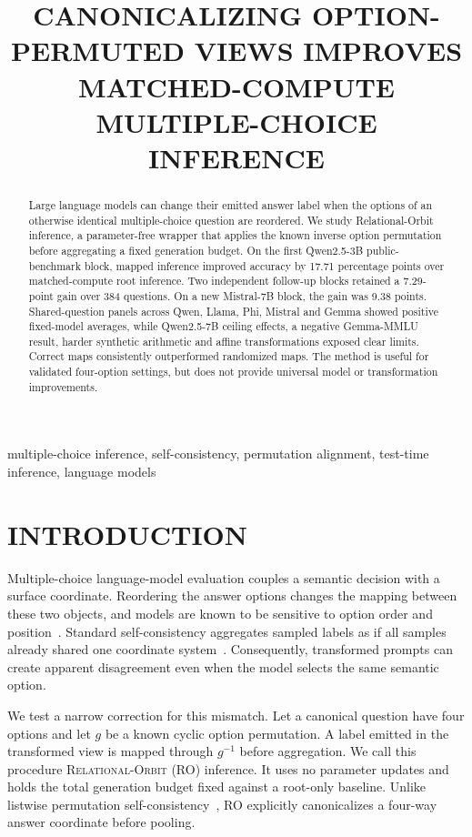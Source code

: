 \documentclass{article}
\title{CANONICALIZING OPTION-PERMUTED VIEWS IMPROVES MATCHED-COMPUTE MULTIPLE-CHOICE INFERENCE}
\begin{document}
\ninept
\maketitle
\vspace{-1.5em}

\begin{abstract}
Large language models can change their emitted answer label when the options of an otherwise identical multiple-choice question are reordered. We study Relational-Orbit inference, a parameter-free wrapper that applies the known inverse option permutation before aggregating a fixed generation budget. On the first Qwen2.5-3B public-benchmark block, mapped inference improved accuracy by 17.71 percentage points over matched-compute root inference. Two independent follow-up blocks retained a 7.29-point gain over 384 questions. On a new Mistral-7B block, the gain was 9.38 points. Shared-question panels across Qwen, Llama, Phi, Mistral and Gemma showed positive fixed-model averages, while Qwen2.5-7B ceiling effects, a negative Gemma-MMLU result, harder synthetic arithmetic and affine transformations exposed clear limits. Correct maps consistently outperformed randomized maps. The method is useful for validated four-option settings, but does not provide universal model or transformation improvements.
\end{abstract}

\begin{keywords}
multiple-choice inference, self-consistency, permutation alignment, test-time inference, language models
\end{keywords}

\section{INTRODUCTION}
Multiple-choice language-model evaluation couples a semantic decision with a surface coordinate. Reordering the answer options changes the mapping between these two objects, and models are known to be sensitive to option order and position~\cite{zheng2023selectors,pezeshkpour2024order}. Standard self-consistency aggregates sampled labels as if all samples already shared one coordinate system~\cite{wang2023selfconsistency}. Consequently, transformed prompts can create apparent disagreement even when the model selects the same semantic option.

We test a narrow correction for this mismatch. Let a canonical question have four options and let $g$ be a known cyclic option permutation. A label emitted in the transformed view is mapped through $g^{-1}$ before aggregation. We call this procedure \textsc{Relational-Orbit} (RO) inference. It uses no parameter updates and holds the total generation budget fixed against a root-only baseline. Unlike listwise permutation self-consistency~\cite{tang2024middle}, RO explicitly canonicalizes a four-way answer coordinate before pooling.
\end{document}
